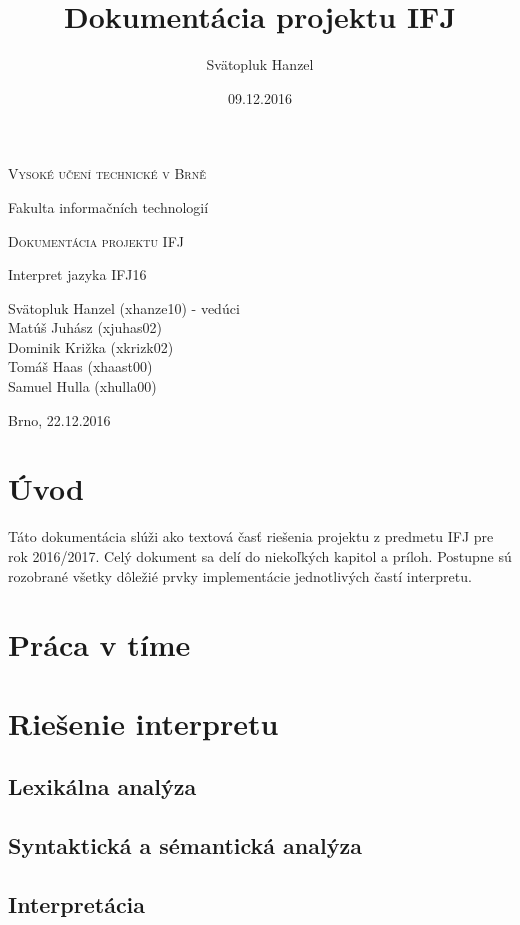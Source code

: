\documentclass[12pt]{article}
\title{Dokumentácia projektu IFJ}
\author{Svätopluk Hanzel}
\date{09.12.2016}
\begin{document}
	\begin{titlepage}
		\begin{center}
		{\scshape\LARGE Vysoké učení technické v Brně \par}
		{\Large Fakulta informačních technologií\par}
		
		
		\vspace{3cm}
		
		{\scshape\LARGE Dokumentácia projektu IFJ\par}
		{\Large Interpret jazyka IFJ16 \par}
		
		
		\vfill
		
		Svätopluk Hanzel (xhanze10) - vedúci\\
		Matúš Juhász (xjuhas02)\\
		Dominik Križka (xkrizk02)\\
		Tomáš Haas (xhaast00)\\
		Samuel Hulla (xhulla00)\\
		\vspace{1cm}
		
		{\hfill Brno, 22.12.2016}
	\end{center}		
	\end{titlepage}
	\tableofcontents{}
	\newpage
	
	\section{Úvod}
		Táto dokumentácia slúži ako textová časť riešenia projektu z predmetu IFJ pre rok 2016/2017. Celý dokument sa delí do niekoľkých kapitol a príloh. Postupne sú rozobrané všetky dôležié prvky implementácie jednotlivých častí interpretu.
		\newpage
	\section{Práca v tíme}
	\section{Riešenie interpretu}
		\subsection{Lexikálna analýza}
		\subsection{Syntaktická a sémantická analýza}
		\subsection{Interpretácia}
\end{document}
